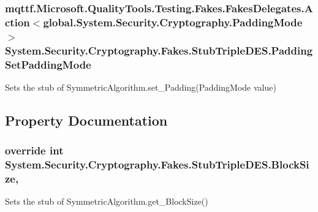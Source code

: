 \hypertarget{class_system_1_1_security_1_1_cryptography_1_1_fakes_1_1_stub_triple_d_e_s_a61045b299f2fe18df11226222d378c8b}{
\subsubsection[{Padding\-Set\-Padding\-Mode}]{\setlength{\rightskip}{0pt plus 5cm}mqttf.\-Microsoft.\-Quality\-Tools.\-Testing.\-Fakes.\-Fakes\-Delegates.\-Action$<$global.\-System.\-Security.\-Cryptography.\-Padding\-Mode$>$ System.\-Security.\-Cryptography.\-Fakes.\-Stub\-Triple\-D\-E\-S.\-Padding\-Set\-Padding\-Mode}}\label{class_system_1_1_security_1_1_cryptography_1_1_fakes_1_1_stub_triple_d_e_s_a61045b299f2fe18df11226222d378c8b}


Sets the stub of Symmetric\-Algorithm.\-set\-\_\-\-Padding(\-Padding\-Mode value)



\subsection{Property Documentation}
\hypertarget{class_system_1_1_security_1_1_cryptography_1_1_fakes_1_1_stub_triple_d_e_s_a75dce7791e1555782e120c0d6c229484}{
\subsubsection[{Block\-Size}]{\setlength{\rightskip}{0pt plus 5cm}override int System.\-Security.\-Cryptography.\-Fakes.\-Stub\-Triple\-D\-E\-S.\-Block\-Size\hspace{0.3cm}{\ttfamily [get]}, {\ttfamily [set]}}}\label{class_system_1_1_security_1_1_cryptography_1_1_fakes_1_1_stub_triple_d_e_s_a75dce7791e1555782e120c0d6c229484}


Sets the stub of Symmetric\-Algorithm.\-get\-\_\-\-Block\-Size()


